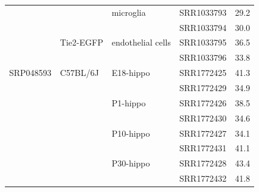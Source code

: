 \begin{longtabu} {X[0.9,c]X[1.1,l]X[1.2,l]X[1,l]X[1,c]}
            &              & microglia   & SRR1033793 & 29.2\\
            &              &             & SRR1033794 & 30.0\\
            & Tie2-EGFP    & endothelial cells & SRR1033795 & 36.5\\
            &              &             & SRR1033796 & 33.8\\
  \midrule
  SRP048593 & C57BL/6J     & E18-hippo   & SRR1772425 & 41.3\\
            &              &             & SRR1772429 & 34.9\\
            &              & P1-hippo    & SRR1772426 & 38.5\\
            &              &             & SRR1772430 & 34.6\\
            &              & P10-hippo   & SRR1772427 & 34.1\\
            &              &             & SRR1772431 & 41.1\\
            &              & P30-hippo   & SRR1772428 & 43.4\\
            &              &             & SRR1772432 & 41.8\\
  \bottomrule
\end{longtabu}

